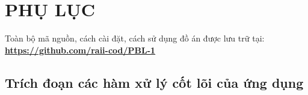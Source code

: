 \documentclass[12pt,a4paper,oneside]{report}
\begin{document}
\newpage
\chapter*{PHỤ LỤC}

\begin{tcolorbox}[
    colback=blue!5!white,
    colframe=blue!75!black,
    title=\textbf{MÃ NGUỒN DỰ ÁN (GITHUB)},
    fonttitle=\bfseries,
    rounded corners,
    arc=4pt,
    boxrule=1pt,
    halign=center
]
    Toàn bộ mã nguồn, cách cài đặt, cách sử dụng đồ án được lưu trữ tại:\\
    \href{https://github.com/raii-cod/PBL-1}{\textbf{\color{blue}https://github.com/raii-cod/PBL-1}}
\end{tcolorbox}
\vspace{1cm}

\section*{Trích đoạn các hàm xử lý cốt lõi của ứng dụng}
\end{document}
